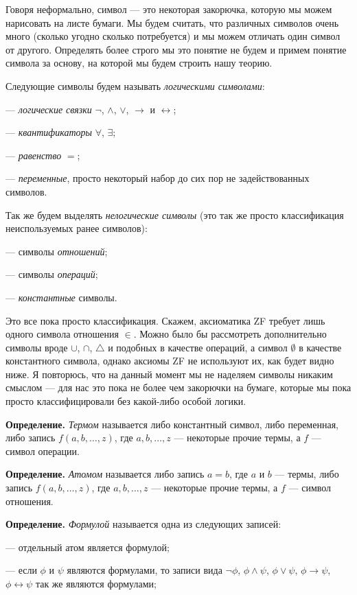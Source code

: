 Говоря неформально, символ — это некоторая закорючка, которую мы можем нарисовать на листе бумаги. Мы будем считать, что различных символов очень много (сколько угодно сколько потребуется) и мы можем отличать один символ от другого. Определять более строго мы это понятие не будем и примем понятие символа за основу, на которой мы будем строить нашу теорию.

Следующие символы будем называть {\slshape логическими символами}:

— {\slshape логические связки} $\neg$, $\wedge$, $\vee$, $\rightarrow$ и $\leftrightarrow$;

— {\slshape квантификаторы} $\forall$, $\exists$;

— {\slshape равенство} $=$;

— {\slshape переменные}, просто некоторый набор до сих пор не задействованных символов.

Так же будем выделять {\slshape нелогические символы} (это так же просто классификация неиспользуемых ранее символов):

— символы {\slshape отношений}{\slshape };

— символы {\slshape операций};

— {\slshape константные} символы.

Это все пока просто классификация. Скажем, аксиоматика ZF требует лишь одного символа отношения $\in$. Можно было бы рассмотреть дополнительно символы вроде $\cup$, $\cap$, $\bigtriangleup$ и подобных в качестве операций, а символ $\emptyset$ в качестве константного символа, однако аксиомы ZF не используют их, как будет видно ниже. Я повторюсь, что на данный момент мы не наделяем символы никаким смыслом — для нас это пока не более чем закорючки на бумаге, которые мы пока просто классифицировали без какой-либо особой логики.

{\bfseries Определение.} {\slshape Термом} называется либо константный символ, либо переменная, либо запись $f(a, b, \ldots, z)$, где $a, b, \ldots, z$ — некоторые прочие термы, а $f$ — символ операции.

{\bfseries Определение.} {\slshape Атомом} называется либо запись $a = b$, где $a$ и $b$ — термы, либо запись $f(a, b, \ldots, z)$, где $a, b, \ldots, z$ — некоторые прочие термы, а $f$ — символ отношения.

{\bfseries Определение.} {\slshape Формулой} называется одна из следующих записей:

— отдельный атом является формулой;

— если $\phi$ и $\psi$ являются формулами, то записи вида $\neg \phi$, $\phi \wedge \psi$, $\phi \vee \psi$, $\phi \rightarrow \psi$, $\phi \leftrightarrow \psi$ так же являются формулами;


